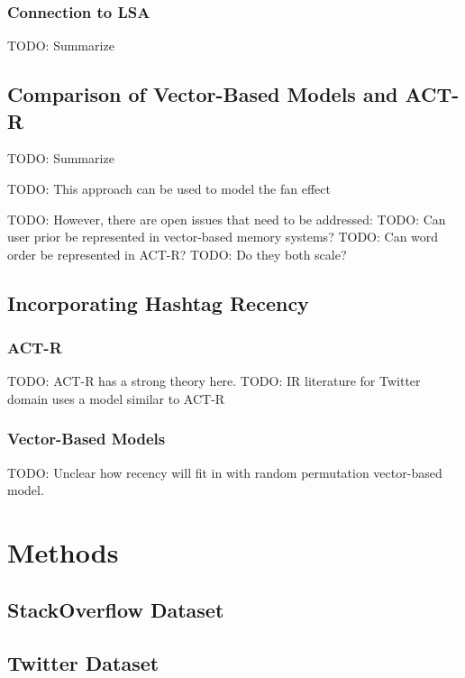 \documentclass[man]{apa6}
\begin{document}
\subsubsection{Connection to LSA}

TODO: Summarize \cite{Kanerva2000}

\subsection{Comparison of Vector-Based Models and ACT-R}

TODO: Summarize \cite{Rutledge2007}

TODO: This approach can be used to model the fan effect \cite{Rutledge2008} 

TODO: However, there are open issues that need to be addressed:
TODO: Can user prior be represented in vector-based memory systems?
TODO: Can word order be represented in ACT-R?
TODO: Do they both scale?

\subsection{Incorporating Hashtag Recency}

\subsubsection{ACT-R}

TODO: ACT-R has a strong theory here.
TODO: IR literature for Twitter domain uses a model similar to ACT-R \cite{Efron2011}

\subsubsection{Vector-Based Models}

TODO: Unclear how recency will fit in with random permutation vector-based model.

\section{Methods}

\subsection{StackOverflow Dataset}

\cite{DataDump2013}

\subsection{Twitter Dataset}
\end{document}
